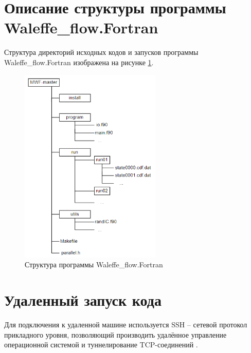 \def\notedate{2022.06.17}
\def\currentauthor{Амелькина А.-М. (РК6)}

\section{Описание структуры программы Waleffe_flow.Fortran}
Структура директорий исходных кодов и запусков программы Waleffe\_flow.Fortran изображена на рисунке \ref{structure}.
\begin{figure}[!ht]
	\centering
	\includegraphics[width=0.6\textwidth]{ResearchNotes/rndcmp_not_rcs_2022_06_17/MWF-иерархия.png}
	\caption{Структура программы Waleffe\_flow.Fortran}\label{structure}
\end{figure} 


\section{Удаленный запуск кода}
Для подключения к удаленной машине используется SSH -- сетевой протокол прикладного уровня, позволяющий производить удалённое управление операционной системой и туннелирование TCP-соединений  \cite{ssh}.

